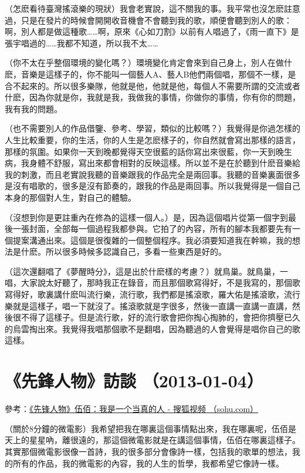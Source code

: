 \documentclass[UTF8,a4paper,oneside,twocolumn,12pt]{ctexbook}
\begin{document}
（怎麽看待臺灣搖滾樂的現狀）我會老實說，這不關我的事。我平常也沒怎麽註意過，只是在發片的時候會開開收音機會不會聽到我的歌，順便會聽到別人的歌：啊，別人都是做這種歌……啊，原來《心如刀割》以前有人唱過了，《雨一直下》是張宇唱過的……我都不知道，所以我不太……

（你不太在乎整個環境的變化嗎？）環境變化肯定會來到自己身上，別人在做什麽，音樂是這樣子的，你不能叫一個藝人A、藝人B他們兩個唱，那個不一樣，是合不起來的。所以很多樂隊，他就是他，他就是他，每個人不需要所謂的交流或者什麽，因為你就是你，我就是我，我做我的事情，你做你的事情，你有你的問題，我有我的問題。

（也不需要別人的作品借鑒、參考、學習，類似的比較嗎？）我覺得是你過怎樣的人生比較重要，你的生活，你的人生是怎麽樣子的，你自然就會寫出那樣的語言，那樣的氛圍。如果你一天到晚都覺得天空很藍的話你寫出來很藍，你一天到晚生病，我身體不舒服，寫出來都會相對的反映這樣。所以並不是在於聽到什麽音樂給我的刺激，而且老實說我聽的音樂跟我的作品完全是兩回事。我聽的音樂裏面很多是沒有唱歌的，很多是沒有節奏的，跟我的作品是兩回事。所以我覺得是一個自己本身的那個對人生，對自己的體驗。

（沒想到你是更註重內在修為的這樣一個人。）是，因為這個唱片從第一個字到最後一張封面，全部每一個過程我都參與。它拍了的內容，所有的腳本我都要先有一個提案溝通出來。這個是很復雜的一個整個程序。我必須要知道我在幹嘛，我的想法是什麽。所以很多時候多認識自己，多看一些東西是好的。

（這次還翻唱了《夢醒時分》，這是出於什麽樣的考慮？）就鳥巢。就鳥巢，一唱，大家說太好聽了，那時我正在錄音，而且那個歌寫得好，不是我寫的，那個歌寫得好，歌裏講什麽叫流行樂，流行歌，我們都是搖滾歌，羅大佑是搖滾歌，流行樂就是這樣子，唱一下就沒了。搖滾歌就是字很多，然後一直講一直講一直講，然後很不得了這樣子。但是流行歌，好的流行歌會把你掏心掏肺的，會把你擠壓已久的烏雲掏出來。我覺得我唱那個歌不是翻唱，因為聽過的人會覺得是唱你自己的歌這樣。

\section{《先鋒人物》訪談 （2013-01-04）}
參考：\href{https://tv.sohu.com/v/MjAxMzAxMDQvbjM2MjMwNjQ1NC5zaHRtbA==.html}{《先锋人物》伍佰：我是一个当真的人 - 搜狐视频 （sohu.com）}

（關於8分鐘的微電影）我希望把我在哪裏這個事情點出來，我在哪裏呢，伍佰是天上的星星吶，離很遠的，那這個微電影就是在講這個事情，伍佰在哪裏這樣子。其實那個微電影很像一首詩，我的很多部分會像詩一樣，包括我的歌單的想法，我的所有的作品，我的微電影的內容，我的人生的哲學，我都希望它像詩一樣。
\end{document}
